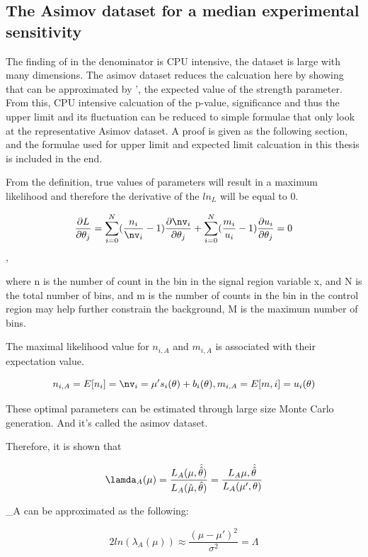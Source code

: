 \subsection{The Asimov dataset for a median experimental sensitivity}

The finding of \hat\hat{\mu} in the denominator is CPU intensive, the dataset is large with many dimensions. The asimov dataset reduces the calcuation here by showing that \hat\hat{\mu} can be approximated by \mu', the expected value of the strength parameter. From this, CPU intensive calcuation of the p-value, significance and thus the upper limit and its fluctuation can be reduced to simple formulae that only look at the representative Asimov dataset. 
A proof is given as the following section, and the formulae used for upper limit and expected limit calcuation in this thesis is included in the end. 

From the definition, true values of parameters will result in a maximum likelihood and therefore the derivative of the $ln_{L}$ will be equal to 0. 

\[ \frac{\partial{L}}{\partial{\theta_{j}}} = \sum_{i=0}^{N}(\frac{n_{i}}{\nv_{i}}-1) \frac{\partial{\nv_{i}}}{\partial{\theta_{j}}}+ \sum_{i=0}^{N}(\frac{m_{i}}{u_{i}}-1) \frac{\partial{u_{i}}}{\partial{\theta_{j}}} =  0 \], 

where n is the number of count in the bin in the signal region variable x, and N is the total number of bins, and m is the number of counts in the bin in the control region may help further constrain the background, M is the maximum number of bins. 

The maximal likelihood value for $n_{i,A}$ and $m_{i,A}$ is associated with their expectation value. 

\[ n_{i,A} = E[n_{i}] = \nv_{i} = \mu's_{i}(\theta) + b_{i}(\theta), 

    m_{i,A} = E[m,i] = u_{i}(\theta) \]

    These optimal parameters \theta can be estimated through large size Monte Carlo generation. And it's called the asimov dataset. 

Therefore, it is shown that 

\[ \lamda_{A}(\mu) = \frac{L_{A}(\mu, \hat{\hat{\theta}})}{L_{A}(\hat{\mu}, \hat{\theta})} = \frac{L_{A}{\mu, \hat{\hat{\theta}}}}{L_{A}(\mu', \theta)} \]

\sigma_{A} can be approximated as the following:

\[ 2ln(\lambda_{A}(\mu)) \approx \frac{(\mu-\mu')^{2}}{\sigma^{2}}=\Lambda
\]

